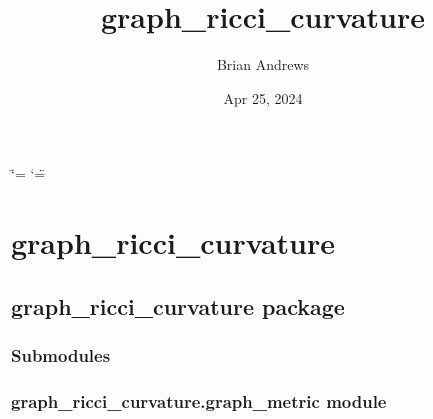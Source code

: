 \documentclass[letterpaper,10pt,english]{sphinxmanual}
\title{graph\_ricci\_curvature}
\date{Apr 25, 2024}
\author{Brian Andrews}
\begin{document}
\ifdefined\shorthandoff
  \ifnum\catcode`\=\string=\active\shorthandoff{=}\fi
  \ifnum\catcode`\"=\active{}\fi
\fi

\pagestyle{empty}
\sphinxmaketitle
\pagestyle{plain}
\sphinxtableofcontents
\pagestyle{normal}
\label{\detokenize{index::doc}}


\sphinxstepscope


\chapter{graph\_ricci\_curvature}
\label{\detokenize{modules:graph-ricci-curvature}}\label{\detokenize{modules::doc}}
\sphinxstepscope


\section{graph\_ricci\_curvature package}
\label{\detokenize{graph_ricci_curvature:graph-ricci-curvature-package}}\label{\detokenize{graph_ricci_curvature::doc}}

\subsection{Submodules}
\label{\detokenize{graph_ricci_curvature:submodules}}

\subsection{graph\_ricci\_curvature.graph\_metric module}
\label{\detokenize{graph_ricci_curvature:module-graph_ricci_curvature.graph_metric}}\label{\detokenize{graph_ricci_curvature:graph-ricci-curvature-graph-metric-module}}
\end{document}
